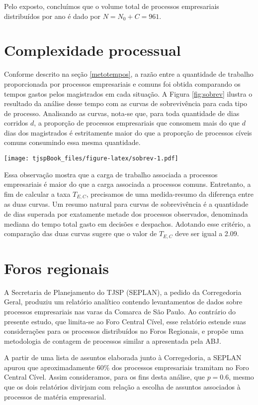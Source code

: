 \documentclass[]{book}
\begin{document}
Pelo exposto, concluímos que o volume total de processos empresariais
distribuídos por ano é dado por \(N = N_0 + C = 961\).

\section{Complexidade processual}\label{tempos}

Conforme descrito na seção \ref{metotempos}, a razão entre a quantidade
de trabalho proporcionada por processos empresariais e comuns foi obtida
comparando os tempos gastos pelos magistrados em cada situação. A Figura
\ref{fig:sobrev} ilustra o resultado da análise desse tempo com as
curvas de sobrevivência para cada tipo de processo. Analisando as
curvas, nota-se que, para toda quantidade de dias corridos \(d\), a
proporção de processos empresariais que consomem mais do que \(d\) dias
dos magistrados é estritamente maior do que a proporção de processos
cíveis comuns consumindo essa mesma quantidade.

\texttt{[image: tjspBook\_files/figure-latex/sobrev-1.pdf]}

Essa observação mostra que a carga de trabalho associada a processos
empresariais é maior do que a carga associada a processos comuns.
Entretanto, a fim de calcular a taxa \(T_{E,C}\), precisamos de uma
medida-resumo da diferença entre as duas curvas. Um resumo natural para
curvas de sobrevivência é a quantidade de dias superada por exatamente
metade dos processos observados, denominada mediana do tempo total gasto
em decisões e despachos. Adotando esse critério, a comparação das duas
curvas sugere que o valor de \(T_{E,C}\) deve ser igual a 2.09.

\section{Foros regionais}\label{regionais}

A Secretaria de Planejamento do TJSP (SEPLAN), a pedido da Corregedoria
Geral, produziu um relatório analítico contendo levantamentos de dados
sobre processos empresariais nas varas da Comarca de São Paulo. Ao
contrário do presente estudo, que limita-se ao Foro Central Cível, esse
relatório estende suas considerações para os processos distribuídos no
Foros Regionais, e propõe uma metodologia de contagem de processos
similar a apresentada pela ABJ.

A partir de uma lista de assuntos elaborada junto à Corregedoria, a
SEPLAN apurou que aproximadamente 60\% dos processos empresariais
tramitam no Foro Central Cível. Assim consideramos, para os fins desta
análise, que \(p = 0.6\), mesmo que os dois relatórios divirjam com
relação a escolha de assuntos associados à processos de matéria
empresarial.
\end{document}
